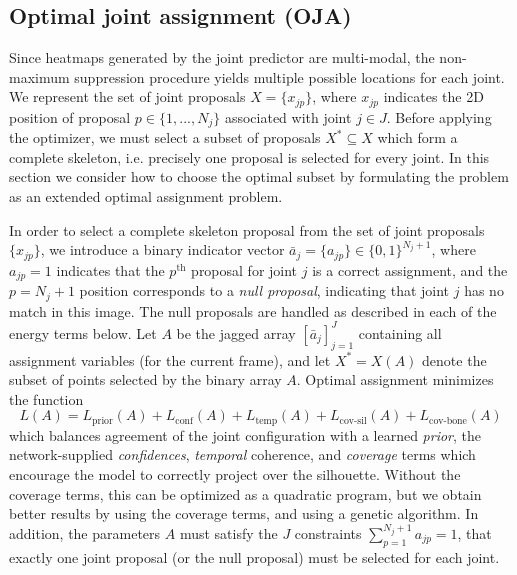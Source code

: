   \subsection{Optimal joint assignment (OJA)}
  \label{sec:qp}
  Since heatmaps generated by the joint predictor are multi-modal, the non-maximum suppression procedure yields multiple possible locations for each joint. We represent the set of joint proposals $X = \{x_{jp}\}$, where $x_{jp}$ indicates the 2D position of proposal $p \in \{1,...,N_j\}$ associated with joint $j \in J$.
  Before applying the optimizer, we must select a subset of proposals $X^* \subseteq X$ which form a complete skeleton, i.e. precisely one proposal is selected for every joint. In this section we consider how to choose the optimal subset by formulating the problem as an extended optimal assignment problem.
  
  \def\bvec#1{\bar{#1}}
  \def\LL#1{L_{\text{#1}}}
  In order to select a complete skeleton proposal from the set of joint proposals $\{x_{jp}\}$, we introduce a binary indicator vector $\bvec a_j = \{a_{jp}\} \in \{0, 1\}^{N_j+1}$, where $a_{jp} = 1$ indicates that the $p^\text{th}$ proposal for joint $j$ is a correct assignment, and the $p = N_j+1$ position corresponds to a {\em null proposal}, indicating that joint $j$ has no match in this image.
  The null proposals are handled as described in each of the energy terms below.
  Let $A$ be the jagged array $[\bvec a_j]_{j=1}^J$ containing all assignment variables (for the current frame), and let $X^* = X(A)$ denote the subset of points selected by the binary array $A$.   
  Optimal assignment minimizes the function
  \begin{equation}
  L(A) = \LL{prior}(A) + \LL{conf}(A) + \LL{temp}(A) + \LL{cov-sil}(A) + \LL{cov-bone}(A)
  \end{equation}
  which balances agreement of the joint configuration with a learned {\em prior}, the network-supplied {\em confidences}, {\em temporal} coherence, and {\em coverage} terms which encourage the  model to correctly project over the silhouette.   Without the coverage terms, this can be optimized as a quadratic program, but we obtain better results by using the coverage terms, and using a genetic algorithm.  In addition, the parameters $A$ must satisfy the $J$ constraints $\sum_{p=1}^{N_j+1} a_{jp} = 1$, that exactly one joint proposal (or the null proposal) must be selected for each joint.
  
  \def\lterm#1{\subsubsection{$\LL{#1}$:}}
  
